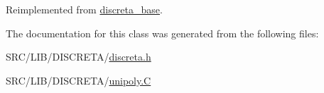 Reimplemented from \mbox{\hyperlink{classdiscreta__base_a424aa44bbb6ca48d30ad1087dbd6f210}{discreta\+\_\+base}}.



The documentation for this class was generated from the following files\+:\begin{DoxyCompactItemize}
\item 
S\+R\+C/\+L\+I\+B/\+D\+I\+S\+C\+R\+E\+T\+A/\mbox{\hyperlink{discreta_8h}{discreta.\+h}}\item 
S\+R\+C/\+L\+I\+B/\+D\+I\+S\+C\+R\+E\+T\+A/\mbox{\hyperlink{_d_i_s_c_r_e_t_a_2unipoly_8_c}{unipoly.\+C}}\end{DoxyCompactItemize}
